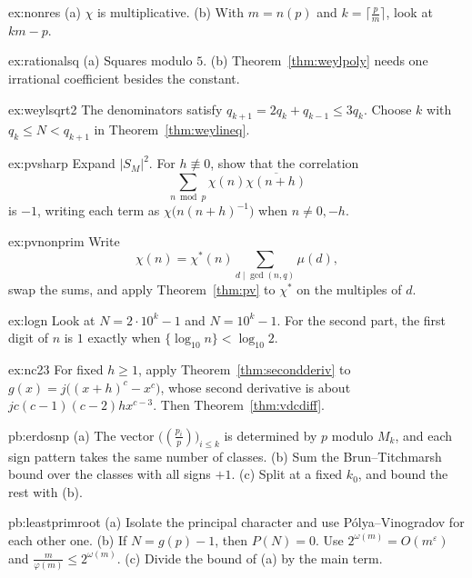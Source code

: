 \begin{hint}{ex:nonres}
(a) $\chi$ is multiplicative. (b) With $m=n(p)$ and $k=\lceil\frac pm\rceil$, look at $km-p$.
\end{hint}
\begin{hint}{ex:rationalsq}
(a) Squares modulo $5$. (b) Theorem~\ref{thm:weylpoly} needs one irrational coefficient besides the constant.
\end{hint}
\begin{hint}{ex:weylsqrt2}
The denominators satisfy $q_{k+1}=2q_k+q_{k-1}\le3q_k$. Choose $k$ with $q_k\le N<q_{k+1}$ in Theorem~\ref{thm:weylineq}.
\end{hint}
\begin{hint}{ex:pvsharp}
Expand $|S_M|^2$. For $h\not\equiv0$, show that the correlation
\[
\sum_{n\bmod p}\chi(n)\overline{\chi(n+h)}
\]
is $-1$, writing each term as $\chi\bigl(n(n+h)^{-1}\bigr)$ when $n\ne0,-h$.
\end{hint}
\begin{hint}{ex:pvnonprim}
Write
\[
\chi(n)=\chi^*(n)\sum_{d\mid\gcd(n,q)}\mu(d),
\]
swap the sums, and apply Theorem~\ref{thm:pv} to $\chi^*$ on the multiples of $d$.
\end{hint}
\begin{hint}{ex:logn}
Look at $N=2\cdot10^k-1$ and $N=10^k-1$. For the second part, the first digit of $n$ is $1$ exactly when $\{\log_{10}n\}<\log_{10}2$.
\end{hint}
\begin{hint}{ex:nc23}
For fixed $h\ge1$, apply Theorem~\ref{thm:secondderiv} to $g(x)=j\bigl((x+h)^c-x^c\bigr)$, whose second derivative is about $jc(c-1)(c-2)hx^{c-3}$. Then Theorem~\ref{thm:vdcdiff}.
\end{hint}

\begin{hint}{pb:erdosnp}
(a) The vector $\bigl((\frac{p_i}p)\bigr)_{i\le k}$ is determined by $p$ modulo $M_k$, and each sign pattern takes the same number of classes. (b) Sum the Brun--Titchmarsh
bound over the classes with all signs $+1$. (c) Split at a fixed $k_0$, and bound the rest with (b).
\end{hint}

\begin{hint}{pb:leastprimroot}
(a) Isolate the principal character and use Pólya--Vinogradov for each other one. (b) If $N=g(p)-1$, then $P(N)=0$. Use $2^{\omega(m)}=O(m^\varepsilon)$ and
$\frac m{\varphi(m)}\le2^{\omega(m)}$. (c) Divide the bound of (a) by the main term.
\end{hint}

